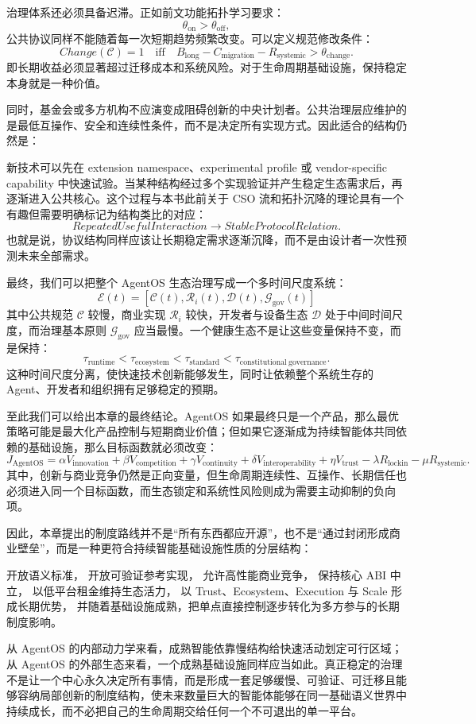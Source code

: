 治理体系还必须具备迟滞。正如前文功能拓扑学习要求：
\[
\theta_{\mathrm{on}}
>
\theta_{\mathrm{off}},
\]
公共协议同样不能随着每一次短期趋势频繁改变。可以定义规范修改条件：
\[
Change(\mathcal C)
=
1
\quad
\text{iff}
\quad
B_{\mathrm{long}}
-
C_{\mathrm{migration}}
-
R_{\mathrm{systemic}}
>
\theta_{\mathrm{change}}.
\]
即长期收益必须显著超过迁移成本和系统风险。对于生命周期基础设施，保持稳定本身就是一种价值。

同时，基金会或多方机构不应演变成阻碍创新的中央计划者。公共治理层应维护的是最低互操作、安全和连续性条件，而不是决定所有实现方式。因此适合的结构仍然是：
\begin{statementbox}
\centering
{}
\end{statementbox}
新技术可以先在 extension namespace、experimental profile 或 vendor-specific capability 中快速试验。当某种结构经过多个实现验证并产生稳定生态需求后，再逐渐进入公共核心。这个过程与本书此前关于 CSO 流和拓扑沉降的理论具有一个有趣但需要明确标记为结构类比的对应：
\[
RepeatedUsefulInteraction
\rightarrow
StableProtocolRelation.
\]
也就是说，协议结构同样应该让长期稳定需求逐渐沉降，而不是由设计者一次性预测未来全部需求。

最终，我们可以把整个 AgentOS 生态治理写成一个多时间尺度系统：
\[
\boxed{
\mathcal E(t)
=
[
\mathcal C(t),
\mathcal R_i(t),
\mathcal D(t),
\mathcal G_{\mathrm{gov}}(t)
]
}
\]
其中公共规范 $\mathcal C$ 较慢，商业实现 $\mathcal R_i$ 较快，开发者与设备生态 $\mathcal D$ 处于中间时间尺度，而治理基本原则 $\mathcal G_{\mathrm{gov}}$ 应当最慢。一个健康生态不是让这些变量保持不变，而是保持：
\[
\tau_{\mathrm{runtime}}
<
\tau_{\mathrm{ecosystem}}
<
\tau_{\mathrm{standard}}
<
\tau_{\mathrm{constitutional\ governance}}.
\]
这种时间尺度分离，使快速技术创新能够发生，同时让依赖整个系统生存的 Agent、开发者和组织拥有足够稳定的预期。

至此我们可以给出本章的最终结论。AgentOS 如果最终只是一个产品，那么最优策略可能是最大化产品控制与短期商业价值；但如果它逐渐成为持续智能体共同依赖的基础设施，那么目标函数就必须改变：
\[
\boxed{
J_{\mathrm{AgentOS}}
=
\alpha V_{\mathrm{innovation}}
+
\beta V_{\mathrm{competition}}
+
\gamma V_{\mathrm{continuity}}
+
\delta V_{\mathrm{interoperability}}
+
\eta V_{\mathrm{trust}}
-
\lambda R_{\mathrm{lockin}}
-
\mu R_{\mathrm{systemic}}.
}
\]
其中，创新与商业竞争仍然是正向变量，但生命周期连续性、互操作、长期信任也必须进入同一个目标函数，而生态锁定和系统性风险则成为需要主动抑制的负向项。

因此，本章提出的制度路线并不是``所有东西都应开源''，也不是``通过封闭形成商业壁垒''，而是一种更符合持续智能基础设施性质的分层结构：
\begin{statementbox}
开放语义标准，
开放可验证参考实现，
允许高性能商业竞争，
保持核心 ABI 中立，
以低平台租金维持生态活力，
以 Trust、Ecosystem、Execution 与 Scale 形成长期优势，
并随着基础设施成熟，把单点直接控制逐步转化为多方参与的长期制度影响。
\end{statementbox}
从 AgentOS 的内部动力学来看，成熟智能依靠慢结构给快速活动划定可行区域；从 AgentOS 的外部生态来看，一个成熟基础设施同样应当如此。真正稳定的治理不是让一个中心永久决定所有事情，而是形成一套足够缓慢、可验证、可迁移且能够容纳局部创新的制度结构，使未来数量巨大的智能体能够在同一基础语义世界中持续成长，而不必把自己的生命周期交给任何一个不可退出的单一平台。
